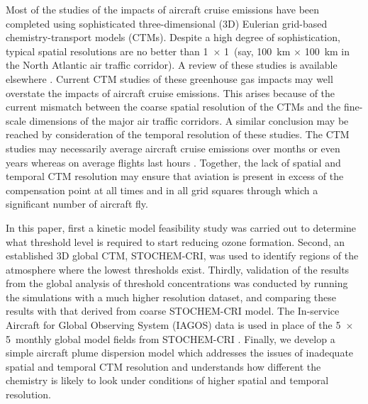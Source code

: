 Most of the studies of the impacts of aircraft cruise emissions have been completed using sophisticated three-dimensional (3D) Eulerian grid-based chemistry-transport models (CTMs). Despite a high degree of sophistication, typical spatial resolutions are no better than 1~\textdegree $\times$ 1~\textdegree (say, 100~km $\times$ 100~km in the North Atlantic air traffic corridor). A review of these studies is available elsewhere \cite{Fuglestvedt1999}. Current CTM studies of these greenhouse gas impacts may well overstate the impacts of aircraft cruise emissions. This arises because of the current mismatch between the coarse spatial resolution of the CTMs and the fine-scale dimensions of the major air traffic corridors. A similar conclusion may be reached by consideration of the temporal resolution of these studies. The CTM studies may necessarily average aircraft cruise emissions over months or even years whereas on average flights last hours \cite{Wasiuk2016}. Together, the lack of spatial and temporal CTM resolution may ensure that aviation  is present in excess of the  compensation point at all times and in all grid squares through which a significant number of aircraft fly.

In this paper, first a kinetic model feasibility study was carried out to determine what  threshold level is required to start reducing ozone formation. Second, an established 3D global CTM, STOCHEM-CRI, was used to identify regions of the atmosphere where the lowest  thresholds exist. Thirdly, validation of the results from the global analysis of  threshold concentrations was conducted by running the simulations with a much higher resolution dataset, and comparing these results with that derived from coarse STOCHEM-CRI model. The In-service Aircraft for Global Observing System (IAGOS) data \cite{IAGOS} is used in place of the 5~\textdegree $\times$ 5~\textdegree monthly global model fields from STOCHEM-CRI \cite{Khan2021}. Finally, we develop a simple aircraft plume dispersion model which addresses the issues of inadequate spatial and temporal CTM resolution and understands how different the chemistry is likely to look under conditions of higher spatial and temporal resolution.